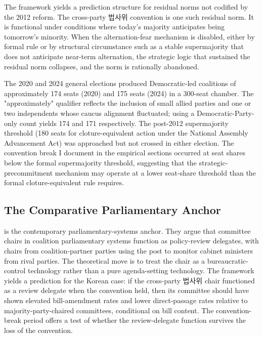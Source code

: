 \documentclass[11pt]{article}
\begin{document}
The framework yields a prediction structure for residual norms not codified by the 2012 reform. The cross-party 법사위 convention is one such residual norm. It is functional under conditions where today's majority anticipates being tomorrow's minority. When the alternation-fear mechanism is disabled, either by formal rule or by structural circumstance such as a stable supermajority that does not anticipate near-term alternation, the strategic logic that sustained the residual norm collapses, and the norm is rationally abandoned.

The 2020 and 2024 general elections produced Democratic-led coalitions of approximately 174 seats (2020) and 175 seats (2024) in a 300-seat chamber. The "approximately" qualifier reflects the inclusion of small allied parties and one or two independents whose caucus alignment fluctuated; using a Democratic-Party-only count yields 174 and 171 respectively. The post-2012 supermajority threshold (180 seats for cloture-equivalent action under the National Assembly Advancement Act) was approached but not crossed in either election. The convention break I document in the empirical sections occurred at seat shares below the formal supermajority threshold, suggesting that the strategic-precommitment mechanism may operate at a lower seat-share threshold than the formal cloture-equivalent rule requires.

\subsection{The Comparative Parliamentary Anchor}

\citet{fmv2017} is the contemporary parliamentary-systems anchor. They argue that committee chairs in coalition parliamentary systems function as policy-review delegates, with chairs from coalition-partner parties using the post to monitor cabinet ministers from rival parties. The theoretical move is to treat the chair as a bureaucratic-control technology rather than a pure agenda-setting technology. The framework yields a prediction for the Korean case: if the cross-party 법사위 chair functioned as a \citet{fmv2017} review delegate when the convention held, then its committee should have shown elevated bill-amendment rates and lower direct-passage rates relative to majority-party-chaired committees, conditional on bill content. The convention-break period offers a test of whether the review-delegate function survives the loss of the convention.
\end{document}
